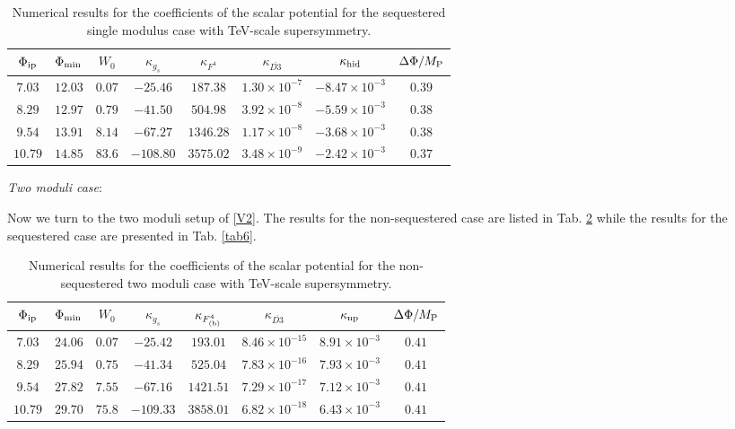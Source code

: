 \documentclass[11pt,a4paper]{article}
\begin{document}
\begin{table}[H]
\begin{center}
\begin{tabular}{cccccccc}
\hline
$\Phi_{\rm ip}$ & $\Phi_{\rm min}$ & $W_0$ & $\kappa_{g_s}$ & $\kappa_{F^4}$ & $\kappa_{\overline{D3}}$ & $\kappa_{\rm hid}$ & $\Delta \Phi/M_{\rm P}$ \\
\hline
$7.03$ & $12.03$ & $0.07$ & $-25.46$ & $187.38$ & $1.30 \times 10^{-7}$ & $-8.47 \times 10^{-3}$ & $0.39$ \\
\hline
$8.29$ & $12.97$ & $0.79$ & $-41.50$ & $504.98$ & $3.92 \times 10^{-8}$ & $-5.59 \times 10^{-3}$ & $0.38$ \\
\hline
$9.54$ & $13.91$ & $8.14$ & $-67.27$ & $1346.28$ & $1.17 \times 10^{-8}$ & $-3.68 \times 10^{-3}$ & $0.38$ \\
\hline
$10.79$ & $14.85$ & $83.6$ & $-108.80$ & $3575.02$ & $3.48 \times10^{-9}$ & $-2.42 \times 10^{-3}$ & $0.37$ \\
\hline
\end{tabular}
\end{center}
\caption{Numerical results for the coefficients of the scalar potential for the sequestered single modulus case with TeV-scale supersymmetry.}
\label{tab4}
\end{table}

\item \textit{Two moduli case}: 

Now we turn to the two moduli setup of \eqref{V2}. The results for the non-sequestered case are listed in Tab. \ref{tab5} while the results for the sequestered case are presented in Tab. \ref{tab6}.
\begin{table}[H]
\begin{center}
\begin{tabular}{cccccccc}
\hline
$\Phi_{\rm ip}$ & $\Phi_{\rm min}$ & $W_0$ & $\kappa_{g_s}$ & $\kappa_{F^4_{\rm (b)}}$ & $\kappa_{\overline{D3}}$ & $\kappa_{\rm np}$ & $\Delta \Phi/M_{\rm P}$ \\
\hline
$7.03$ & $24.06$ & $0.07$ & $-25.42$ & $193.01$ & $8.46 \times 10^{-15}$  & $8.91 \times 10^{-3}$ & $0.41$\\
\hline
$8.29$ & $25.94$ & $0.75$ & $-41.34$ & $525.04$ & $7.83 \times 10^{-16}$ & $7.93 \times 10^{-3}$ & $0.41$ \\
\hline
$9.54$ & $27.82$ & $7.55$ & $-67.16$ & $1421.51$ & $7.29 \times 10^{-17}$ & $7.12 \times 10^{-3}$ & $0.41$ \\
\hline
$10.79$ & $29.70$ & $75.8$ & $-109.33$ & $3858.01$ & $6.82 \times 10^{-18}$ & $6.43 \times 10^{-3}$ & $0.41$ \\
\hline
\end{tabular}
\end{center}
\caption{Numerical results for the coefficients of the scalar potential for the non-sequestered two moduli case with TeV-scale supersymmetry.}
\label{tab5}
\end{table}
\end{document}
